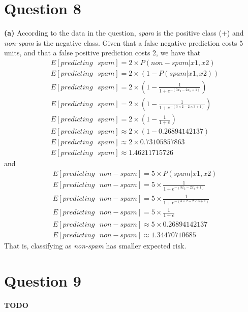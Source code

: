 \documentclass[leqno]{article}
\begin{document}
\section*{Question 8} \noindent \textbf{(a)} According to the data in the question, \textit{spam} is the positive class (+) and \textit{non-spam} is the negative class. 
Given that a false negative prediction costs 5 units, and that a false positive prediction costs 2, we have that
\begin{equation*}
\begin{split}
&E[predicting\mbox{ }spam] = 2 \times P(non-spam|x1, x2)\\
&E[predicting\mbox{ }spam] = 2 \times (1 - P(spam|x1, x2))\\
&E[predicting\mbox{ }spam] = 2 \times (1 - \frac{1}{1 + e^{-(3x_2 - 2x_1 + 1)}})\\
&E[predicting\mbox{ }spam] = 2 \times (1 - \frac{1}{1 + e^{-(3 \times 2 - 2 \times 3 + 1)}})\\
&E[predicting\mbox{ }spam] = 2 \times (1 - \frac{1}{1 + e})\\
&E[predicting\mbox{ }spam] \approx 2 \times (1 - 0.26894142137)\\
&E[predicting\mbox{ }spam] \approx 2 \times 0.73105857863\\
&E[predicting\mbox{ }spam] \approx 1.46211715726
\end{split}
\end{equation*} 
and
\begin{equation*}
\begin{split}
&E[predicting\mbox{ }non-spam] = 5 \times P(spam|x1, x2)\\
&E[predicting\mbox{ }non-spam] = 5 \times \frac{1}{1 + e^{-(3x_2 - 2x_1 + 1)}}\\
&E[predicting\mbox{ }non-spam] = 5 \times \frac{1}{1 + e^{-(3 \times 2 - 2 \times 3 + 1)}}\\
&E[predicting\mbox{ }non-spam] = 5 \times \frac{1}{1 + e}\\
&E[predicting\mbox{ }non-spam] \approx 5 \times 0.26894142137\\
&E[predicting\mbox{ }non-spam] \approx 1.34470710685
\end{split}
\end{equation*} 
That is, classifying as \textit{non-spam} has smaller expected risk.

\section*{Question 9} \textbf{TODO}
\end{document}
